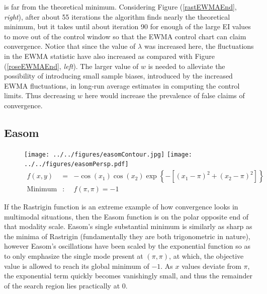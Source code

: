 \documentclass[12pt]{article}
\begin{document}
	is far from the theoretical minimum.
	Considering Figure (\ref{rastEWMAEnd}, {\it right}), after about 55 iterations the algorithm finds nearly the theoretical minimum, but it takes until about iteration 90 for enough of the large EI values to move out of the control window so that the EWMA control chart can claim convergence.
	Notice that since the value of $\lambda$ was increased here, the fluctuations in the EWMA statistic have also increased as compared with Figure (\ref{roseEWMAEnd}, {\it left}).
	The larger value of $w$ is needed to alleviate the possibility of introducing small sample biases, introduced by the increased EWMA fluctuations, in long-run average estimates in computing the control limits.
	Thus decreasing $w$ here would increase the prevalence of false claims of convergence.
	
	\clearpage
	\subsection{Easom}
	
	\begin{figure}[!h]
	\centering
	\texttt{[image: ../../figures/easomContour.jpg]}
	\texttt{[image: ../../figures/easomPersp.pdf]}
	\vspace{-0.2cm}
	\begin{eqnarray}
	f(x,y) &=& -\cos \left(x_1\right)\cos \left(x_2\right) \exp\left\{-\left[\left(x_1-\pi\right)^{2} + \left(x_2-\pi\right)^{2}\right]\right\}\\
	\text{Minimum}&:& f(\pi, \pi)=-1\nonumber
	\end{eqnarray}
	\end{figure}
	\vspace{-0.3cm}
	
	If the Rastrigin function is an extreme example of how convergence looks in multimodal situations, then the Easom function is on the polar opposite end of that modality scale.
	Easom's single substantial minimum is similarly as sharp as the minima of Rastrigin (fundamentally they are both trigonometric in nature), however Easom's oscillations have been scaled by the exponential function so as to only emphasize the single mode present at $(\pi, \pi)$, at which, the objective value is allowed to reach its global minimum of $-1$.
	As $x$ values deviate from $\pi$, the exponential term quickly becomes vanishingly small, and thus the remainder of the search region lies practically at 0. 
	
\end{document}
